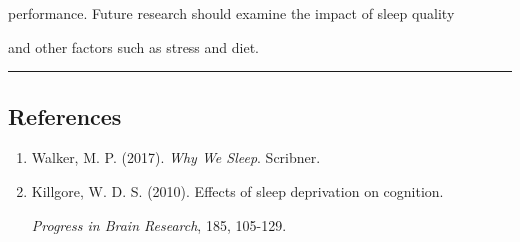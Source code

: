 \documentclass{article}
\begin{document}
performance. Future research should examine the impact of sleep quality

and other factors such as stress and diet.



\begin{center}\rule{0.5\linewidth}{0.5pt}\end{center}



\subsection{References}\label{references}



\begin{enumerate}

\def\labelenumi{\arabic{enumi}.}

\tightlist

\item

  Walker, M. P. (2017). \emph{Why We Sleep}. Scribner.\\

\item

  Killgore, W. D. S. (2010). Effects of sleep deprivation on cognition.

  \emph{Progress in Brain Research}, 185, 105-129.

\end{enumerate}
\end{document}
